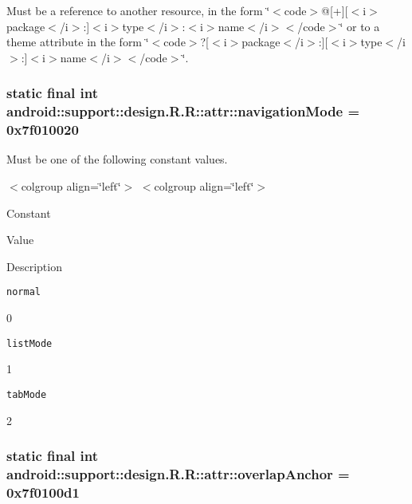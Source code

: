 Must be a reference to another resource, in the form \char`\"{}$<$code$>$@\mbox{[}+\mbox{]}\mbox{[}$<$i$>$package$<$/i$>$:\mbox{]}$<$i$>$type$<$/i$>$:$<$i$>$name$<$/i$>$$<$/code$>$\char`\"{} or to a theme attribute in the form \char`\"{}$<$code$>$?\mbox{[}$<$i$>$package$<$/i$>$:\mbox{]}\mbox{[}$<$i$>$type$<$/i$>$:\mbox{]}$<$i$>$name$<$/i$>$$<$/code$>$\char`\"{}. \hypertarget{classandroid_1_1support_1_1design_1_1_r_1_1attr_add8a027fd60857d6dd1b1f181e050c7}{
\subsubsection[{navigationMode}]{\setlength{\rightskip}{0pt plus 5cm}static final int android::support::design.R.R::attr::navigationMode = 0x7f010020}}
\label{classandroid_1_1support_1_1design_1_1_r_1_1attr_add8a027fd60857d6dd1b1f181e050c7}


Must be one of the following constant values. \begin{TabularC}{0}
\hline
\end{TabularC}
$<$colgroup align=\char`\"{}left\char`\"{}$>$ $<$colgroup align=\char`\"{}left\char`\"{}$>$ 

Constant

Value

Description 

{\tt normal}

0

{\tt listMode}

1

{\tt tabMode}

2\hypertarget{classandroid_1_1support_1_1design_1_1_r_1_1attr_5711e7e5379db9f7ad1041623c3f2dd6}{
\subsubsection[{overlapAnchor}]{\setlength{\rightskip}{0pt plus 5cm}static final int android::support::design.R.R::attr::overlapAnchor = 0x7f0100d1}}
\label{classandroid_1_1support_1_1design_1_1_r_1_1attr_5711e7e5379db9f7ad1041623c3f2dd6}


